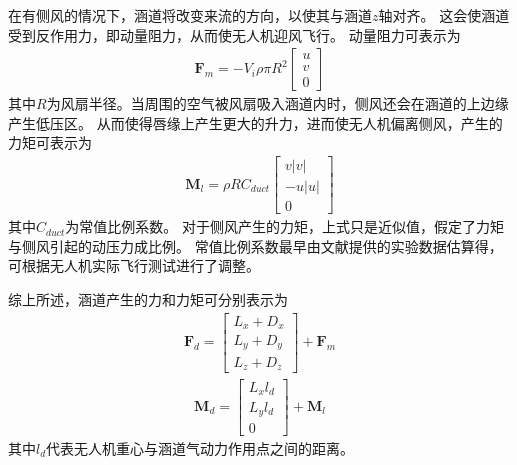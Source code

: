 在有侧风的情况下，涵道将改变来流的方向，以使其与涵道$ z $轴对齐。 这会使涵道受到反作用力，即动量阻力，从而使无人机迎风飞行。 动量阻力可表示为\cite{Fleming_2003}
\begin{align}\bm{F}_{{m}}=-V_{i} \rho \pi R^{2}\left[\begin{array}{c}
u \\
v \\
0
\end{array}\right]\end{align}
其中$ R $为风扇半径。当周围的空气被风扇吸入涵道内时，侧风还会在涵道的上边缘产生低压区。 从而使得唇缘上产生更大的升力，进而使无人机偏离侧风，产生的力矩可表示为\cite{Fleming_2003}
\begin{align}\bm{M}_{{l}}=\rho R C_{d u c t} \left[\begin{array}{r}
v\left|v\right| \\
-u\left|u\right| \\
0
\end{array}\right]\end{align}
其中$ C_{d u c t} $为常值比例系数。 对于侧风产生的力矩，上式只是近似值，假定了力矩与侧风引起的动压力成比例。 常值比例系数最早由文献\parencite{Fleming_2003}提供的实验数据估算得，可根据无人机实际飞行测试进行了调整。

综上所述，涵道产生的力和力矩可分别表示为
\begin{align}
\bm{F}_{{d}}=
\begin{bmatrix}
L_{x}+D_{x} \\
L_{y}+D_{y} \\
L_{z}+D_{z}
\end{bmatrix}
+\bm{F}_{{m}} 
\end{align}
\begin{align}
\bm{M}_{{d}}=
\begin{bmatrix}
L_{x} l_{d} \\
L_{y} l_{d} \\
0
\end{bmatrix}
+\bm{M}_{{l}}
\end{align}
其中$ l_{d} $代表无人机重心与涵道气动力作用点之间的距离。 

